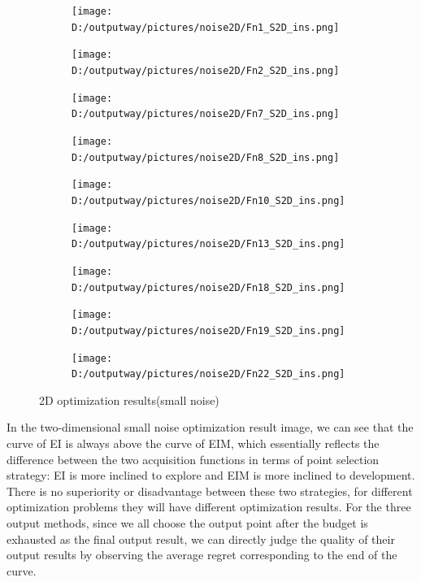 \documentclass{article}
\begin{document}
\begin{figure}[H]
    \centering
    \begin{subfigure}[t]{.32\linewidth}
        \centering
        \texttt{[image: D:/outputway/pictures/noise2D/Fn1\_S2D\_ins.png]}
    \end{subfigure}
    \begin{subfigure}[t]{.32\linewidth}
        \centering
        \texttt{[image: D:/outputway/pictures/noise2D/Fn2\_S2D\_ins.png]}
    \end{subfigure}
    \begin{subfigure}[t]{.32\linewidth}
        \centering
        \texttt{[image: D:/outputway/pictures/noise2D/Fn7\_S2D\_ins.png]}
    \end{subfigure}
    \begin{subfigure}[t]{.32\linewidth}
        \centering
        \texttt{[image: D:/outputway/pictures/noise2D/Fn8\_S2D\_ins.png]}
    \end{subfigure}
    \begin{subfigure}[t]{.32\linewidth}
        \centering
        \texttt{[image: D:/outputway/pictures/noise2D/Fn10\_S2D\_ins.png]}
    \end{subfigure}
    \begin{subfigure}[t]{.32\linewidth}
        \centering
        \texttt{[image: D:/outputway/pictures/noise2D/Fn13\_S2D\_ins.png]}
    \end{subfigure}
    \begin{subfigure}[t]{.32\linewidth}
        \centering
        \texttt{[image: D:/outputway/pictures/noise2D/Fn18\_S2D\_ins.png]}
    \end{subfigure}
    \begin{subfigure}[t]{.32\linewidth}
        \centering
        \texttt{[image: D:/outputway/pictures/noise2D/Fn19\_S2D\_ins.png]}
    \end{subfigure}
    \begin{subfigure}[t]{.32\linewidth}
        \centering
        \texttt{[image: D:/outputway/pictures/noise2D/Fn22\_S2D\_ins.png]}
    \end{subfigure}
    \caption{2D optimization results(small noise)}
    \label{Fig2}
\end{figure}
\hspace{2em}In the two-dimensional small noise optimization result image, we can see that the curve of EI is always above the curve of EIM, which essentially reflects the difference between the two acquisition functions in terms of point selection strategy: EI is more inclined to explore and EIM is more inclined to development. There is no superiority or disadvantage between these two strategies, for different optimization problems they will have different optimization results. For the three output methods, since we all choose the output point after the budget is exhausted as the final output result, we can directly judge the quality of their output results by observing the average regret corresponding to the end of the curve.
\end{document}

